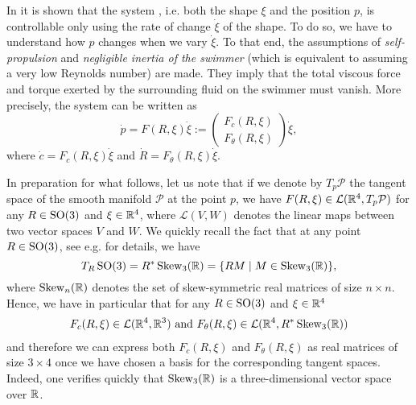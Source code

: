 In \cite{Alouges2013} it is shown that the system \spr, i.e. both the shape $\xi$ and the position $p$, is controllable only using the rate of change $\dot{\xi}$ of the shape. To do so, we have to understand how $p$ changes when we vary $\dot{\xi}$. To that end, the assumptions of \emph{self-propulsion} and \emph{negligible inertia of the swimmer} (which is equivalent to assuming a very low Reynolds number) are made. They imply that the total viscous force and torque exerted by the surrounding fluid on the swimmer must vanish. More precisely, the system can be written as
\begin{equation}
\label{eq: control system}
	\dot{p} = F(R, \xi) \dot{\xi} := \left ( \begin{array}{c}
	F_c(R, \xi) \\
	F_\theta(R, \xi)
	\end{array}  \right ) \dot{\xi},
\end{equation}
where $\dot{c} = F_c(R, \xi) \dot{\xi}$ and $\dot{R} = F_\theta (R, \xi) \dot{\xi} $. 

In preparation for what follows, let us note that if we denote by $T_p \mathcal{P}$ the tangent space of the smooth manifold $\mathcal{P}$ at the point $p$, we have $F(R, \xi) \in \mathcal{L}(\mathbb{R}^4, T_{p}\mathcal{P})$ for any $R \in \operatorname{SO}(3)$ and $\xi \in \mathbb{R}^4$, where $\mathcal{L}(V, W)$ denotes the linear maps between two vector spaces $V$ and $W$. We quickly recall the fact that at any point $R \in \operatorname{SO}(3)$, see e.g. \cite{Hall2015} for details, we have 
\begin{equation}
	T_R \operatorname{SO}(3) = R^* \operatorname{Skew}_3(\mathbb{R}) = \{R M \mid M \in \operatorname{Skew}_3(\mathbb{R})\},
\end{equation}
where $\operatorname{Skew}_n(\mathbb{R})$ denotes the set of skew-symmetric real matrices of size $n \times n$. Hence, we have in particular that for any $R \in \operatorname{SO}(3)$ and $\xi \in \mathbb{R}^4$
\begin{equation}
\begin{aligned}
	F_c(R, \xi) \in \mathcal{L}(\mathbb{R}^4, \mathbb{R}^3) \text{ and } F_{\theta}(R, \xi) \in \mathcal{L}(\mathbb{R}^4, R^* \operatorname{Skew}_3(\mathbb{R}))
\end{aligned}
\end{equation}
and therefore we can express both $F_c(R, \xi)$ and $F_{\theta}(R, \xi)$ as real matrices of size $3 \times 4$ once we have chosen a basis for the corresponding tangent spaces. Indeed, one verifies quickly that $\operatorname{Skew}_3(\mathbb{R})$ is a three-dimensional vector space over $\mathbb{R}$.


